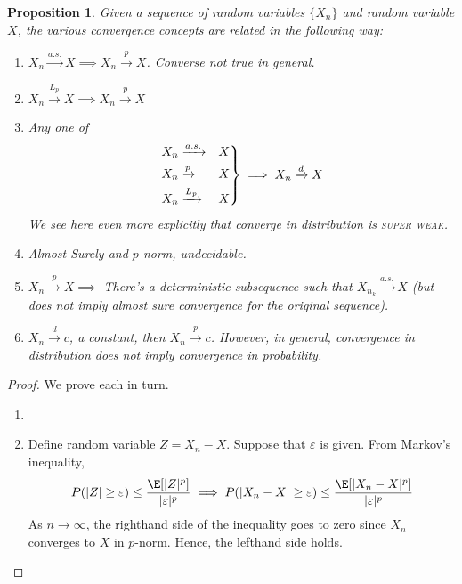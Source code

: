 \documentclass[12pt]{article}
\theoremstyle{plain}
\newtheorem{prop}[thm]{Proposition}
\theoremstyle{definition}
\theoremstyle{remark}
\newcommand{\ra}{\rightarrow}
\newenvironment{rcases}
  {\left.\begin{aligned}}
  {\end{aligned}\right\rbrace}
\newcommand{\asto}{\xrightarrow{a.s.}}
\newcommand{\pto}{\xrightarrow{p}}
\newcommand{\dto}{\xrightarrow{d}}
\newcommand{\Lpto}{\xrightarrow{L_p}}
\begin{document}
\begin{prop}
Given a sequence of random variables $\{X_n\}$ and random variable $X$,
the various convergence concepts are related in the following way:
\begin{enumerate}
  \item $X_n\asto X \implies X_n\pto X$. Converse not true in general.
  \item $X_n\Lpto X \implies X_n\pto X$
  \item Any one of
    \begin{align*}
      \begin{rcases}
        X_n&\asto &X \\
        X_n&\pto &X \\
        X_n&\Lpto &X
      \end{rcases}
      \implies X_n\dto X
    \end{align*}
    We see here even more explicitly that converge in distribution is
    \textsc{super weak}.
  \item Almost Surely and $p$-norm, undecidable.
  \item $X_n\pto X \implies$ There's a deterministic subsequence such
    that $X_{n_k}\asto X$ (but does not imply almost sure convergence
    for the original sequence).

  \item $X_n\dto c$, a constant, then $X_n\pto c$. However, in general,
    convergence in distribution does not imply convergence in
    probability.
\end{enumerate}
\end{prop}
\begin{proof}
We prove each in turn.
\begin{enumerate}
  \item

  \item Define random variable $Z=X_n-X$. Suppose that $\varepsilon$ is
    given. From Markov's inequality,
    \begin{align*}
      P(|Z| \geq \varepsilon) \leq \frac{\E[|Z|^p]}{|\varepsilon|^p}
      \implies
      P(|X_n-X| \geq \varepsilon) \leq \frac{\E[|X_n-X|^p]}{|\varepsilon|^p}
    \end{align*}
    As $n\ra\infty$, the righthand side of the inequality goes to zero
    since $X_n$ converges to $X$ in $p$-norm. Hence, the lefthand side
    holds.
\end{enumerate}
\end{proof}
\end{document}
